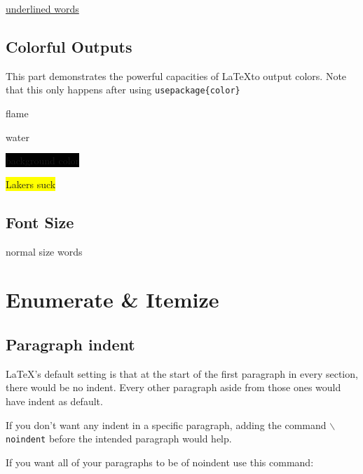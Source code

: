 \documentclass[a4paper,12pt]{article}
\begin{document}
        \underline{underlined words}


    \subsection{Colorful Outputs}
    This part demonstrates the powerful capacities of \LaTeX to output colors. 
    Note that this only happens after using \texttt{usepackage\{color\}} 

    {\color{red}flame} 

    {\color{blue}water} 

    \colorbox{black}{\color{white}background color} 

    \colorbox{yellow}{\color{magenta}Lakers suck} 

    \subsection{Font Size}
    normal size words









\section{Enumerate \& Itemize}
    \subsection{Paragraph indent}
    \LaTeX 's default setting is that
    at the start of the first paragraph in 
    every section, there would be no indent.
    Every other paragraph aside from those ones would have 
    indent as default. 

    If you don't want any indent in a specific paragraph,
    adding the command \texttt{$\backslash$noindent} before 
    the intended paragraph would help.

    If you want all of your paragraphs to be of noindent
    use this command:
    
\end{document}
